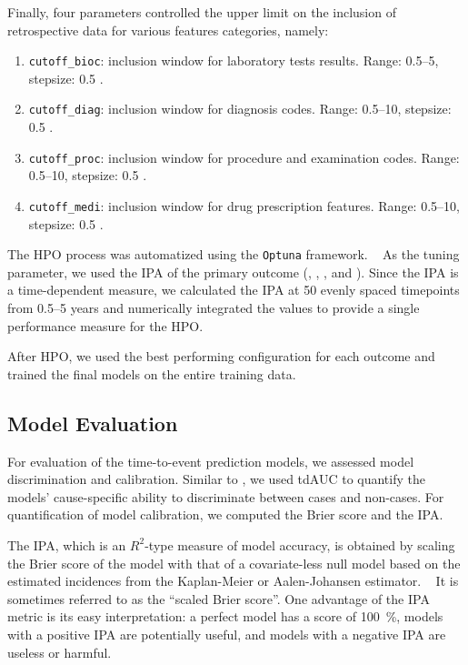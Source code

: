 \begin{fullwidth}
\begin{multicols}{3}
Finally, four parameters controlled the upper limit on the inclusion of 
retrospective data for various features categories, namely:
\begin{enumerate}[label=\alph*), resume]
    \item \verb|cutoff_bioc|: 
        inclusion window for
        laboratory tests results.
        Range: \numrange{0.5}{5},
        stepsize: \num{0.5} .
    \item \verb|cutoff_diag|:
        inclusion window for
        diagnosis codes.
        Range: \numrange{0.5}{10},
        stepsize:  \num{0.5} .
    \item \verb|cutoff_proc|:
        inclusion window for
        procedure and examination codes.
        Range: \numrange{0.5}{10},
        stepsize: \num{0.5} .
    \item \verb|cutoff_medi|:
        inclusion window for
        drug prescription features.
        Range: \numrange{0.5}{10},
        stepsize: \num{0.5} .
\end{enumerate}
    
\end{multicols}
\end{fullwidth}

The \ac{HPO} process was automatized using the \verb|Optuna| framework.
~\autocite{akibaOptuna2019}
As the tuning parameter,
we used the \ac{IPA} of the primary outcome 
(, , , and ).
Since the \ac{IPA} is a time-dependent measure,
we calculated the \ac{IPA} at 50 evenly spaced timepoints from
\numrange{0.5}{5} years and numerically integrated the values
to provide a single performance measure for the \ac{HPO}. 

After \ac{HPO}, 
we used the best performing configuration for each outcome
and trained the final models on the entire training data.

\subsection{Model Evaluation}

For evaluation of the  time-to-event prediction models,
we assessed model discrimination and calibration. 
Similar to \studyii{}, we used \ac{tdAUC} to quantify the models'
cause-specific ability to discriminate between cases and non-cases.
For quantification of model calibration,
we computed the Brier score and the \ac{IPA}. 

The \ac{IPA},
which is an \(R^{2}\)-type measure of model accuracy,
is obtained by scaling the Brier score 
of the model with that of a covariate-less null model 
based on the estimated incidences from the Kaplan-Meier or Aalen-Johansen
estimator.
~\autocite{kattanIndex2018}
It is sometimes referred to as the \enquote{scaled Brier score}.
One advantage of the \ac{IPA} metric is its easy interpretation:
a perfect model has a score of \qty{100}{\percent},
models with a positive \ac{IPA} are potentially useful,
and models with a negative \ac{IPA} are useless or harmful.


